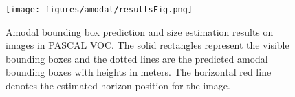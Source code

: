 \begin{figure}[htb]
  \centering
  \texttt{[image: figures/amodal/resultsFig.png]}

\caption{ Amodal bounding box prediction and size estimation results on images in PASCAL VOC. The solid rectangles represent the visible bounding boxes and the dotted lines are the predicted amodal bounding boxes with heights in meters. The horizontal red line denotes the estimated horizon position for the image.}
\end{figure}
